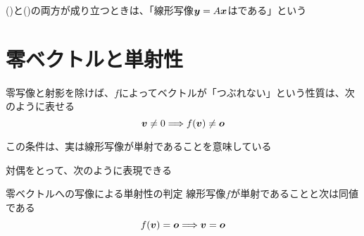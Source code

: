 \documentclass[../../../topic_linear-algebra]{subfiles}
\begin{document}
()と()の両方が成り立つときは、「線形写像$\vb*{y} = A\vb*{x}$はである」という

\sectionline
\section{零ベクトルと単射性}\label{sec:zero-vector-and-injectivity}

零写像と射影を除けば、$f$によってベクトルが「つぶれない」という性質は、次のように表せる
\begin{equation*}
  \vb*{v} \neq 0 \Longrightarrow f(\vb*{v}) \neq \vb*{o}
\end{equation*}


この条件は、実は線形写像が単射であることを意味している

対偶をとって、次のように表現できる

\begin{theorem}{零ベクトルへの写像による単射性の判定}\label{thm:injective-zero-test}
  線形写像$f$が単射であることと次は同値である
  \begin{equation*}
    f(\vb*{v}) = \vb*{o} \Longrightarrow \vb*{v} = \vb*{o}
  \end{equation*}
\end{theorem}
\end{document}

